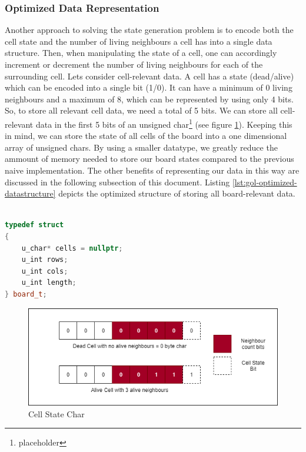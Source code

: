 \documentclass[a4paper,english,12pt,twoside=false]{scrartcl} %
\begin{document}
\subsubsection{Optimized Data Representation}

Another approach to solving the state generation problem is to encode both the cell state and the number of living neighbours a cell has into a single data structure. Then, when manipulating the state of a cell, one can accordingly increment or decrement the number of living neighbours for each of the surrounding cell. Lets consider cell-relevant data. A cell has a state (dead/alive) which can be encoded into a single bit (1/0). It can have a minimum of 0 living neighbours and a maximum of 8, which can be represented by using only 4 bits. So, to store all relevant cell data, we need a total of 5 bits. We can store all cell-relevant data in the first 5 bits of an unsigned char\footnote{placeholder} (see figure \ref{fig:cell-state}). Keeping this in mind, we can store the state of all cells of the board into a one dimensional array of unsigned chars. By using a smaller datatype, we greatly reduce the ammount of memory needed to store our board states compared to the previous naive implementation. The other benefits of representing our data in this way are discussed in the following subsection of this document. Listing \ref{lst:gol-optimized-datastructure} depicts the optimized structure of storing all board-relevant data.

\begin{lstlisting}[caption={Parallel Naive State Generation Algorithm},label={lst:gol-optimized-datastructure},language=C++]

typedef struct
{
    u_char* cells = nullptr;
    u_int rows;
    u_int cols;
    u_int length;
} board_t;

\end{lstlisting}

\begin{figure}[tbh!]
	\centering
	\includegraphics[width=16cm]{imgs/cell-state.png}
	\caption{Cell State Char}
	\label{fig:cell-state}
\end{figure}
\end{document}
